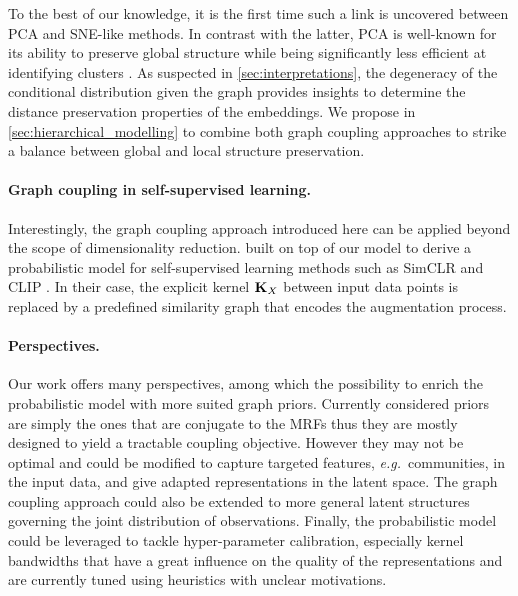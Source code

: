 To the best of our knowledge, it is the first time such a link is uncovered between PCA and SNE-like methods. In contrast with the latter, PCA is well-known for its ability to preserve global structure while being significantly less efficient at identifying clusters \citep{anowar2021conceptual}. As suspected in \cref{sec:interpretations}, the degeneracy of the conditional distribution given the graph provides insights to determine the distance preservation properties of the embeddings. We propose in \cref{sec:hierarchical_modelling} to combine both graph coupling approaches to strike a balance between global and local structure preservation.


\paragraph{Graph coupling in self-supervised learning.}
Interestingly, the graph coupling approach introduced here can be applied beyond the scope of dimensionality reduction. \citet{tan2023contrastive} built on top of our model to derive a probabilistic model for self-supervised learning methods such as SimCLR \citep{chen2020simple} and CLIP \citep{radford2021learning}. In their case, the explicit kernel ${\mathbf{K}}_{X}$ between input data points is replaced by a predefined similarity graph that encodes the augmentation process.

\paragraph{Perspectives.}
Our work offers many perspectives, among which the possibility to enrich the probabilistic model with more suited graph priors. Currently considered priors are simply the ones that are conjugate to the MRFs thus they are mostly designed to yield a tractable coupling objective. However they may not be optimal and could be modified to capture targeted features, \textit{e.g.}\ communities, in the input data, and give adapted representations in the latent space. The graph coupling approach could also be extended to more general latent structures governing the joint distribution of observations.
Finally, the probabilistic model could be leveraged to tackle hyper-parameter calibration, especially kernel bandwidths that have a great influence on the quality of the representations and are currently tuned using heuristics with unclear motivations.


